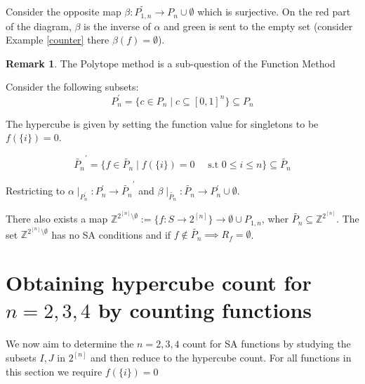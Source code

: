 \documentclass[a4paper,12pt]{article}
\theoremstyle{definition}
\theoremstyle{indented}
\newtheorem*{remark}{Remark}
\begin{document}
   Consider the opposite map $\beta: \tilde{P_{1,n}} \rightarrow P_n \cup \emptyset$ which is surjective. On the red part of the diagram, $\beta$ is the inverse of $\alpha$ and green is sent to the empty set (consider Example \ref{counter} there $\beta(f)=\emptyset$).
 
    \medskip 
    
    
    \begin{remark}
             The Polytope method is a sub-question of the Function Method
    \end{remark}
        Consider the following subsets: 
            $$P_n ^{'} = \{ c \in P_n \mid c \subseteq [0,1]^n\} \subseteq  P_n$$
            
            The hypercube is given by setting the function value for singletons to be $f(\{i\})=0$.

            
            $$\tilde{P_n}^{'} = \{ f \in  \tilde{P_{n}} \mid  f (\{ i \})=0 \quad \text{ s.t }  0 \le i\le n \} \subseteq \tilde{P_n}$$
            
            
    Restricting to $\alpha \mid_{P_n ^{'}} : P_n ^{'} \rightarrow \tilde{P_n}^{'}$ and  $\beta \mid _{\tilde{P_n}} : \tilde{P_n} \rightarrow P_{n}^{'} \cup \emptyset$. 
    
    \medskip
    
     There also exists a map $\mathbb{Z}^{ 2^{[n]} \setminus \emptyset} := \{ f : S \rightarrow  2^{[n]} \} \rightarrow  \emptyset \cup P_{1,n}$, wher $\tilde{P_n}   \subseteq \mathbb{Z}^{ 2^{[n]} }$.  The set $\mathbb{Z}^{ 2^{[n]} \setminus \emptyset}$ has no SA conditions and if $f \notin \tilde{P_n}  \implies R_f=\emptyset$.

\section{Obtaining hypercube count for $n=2,3,4$ by counting functions}

We now aim to determine the $n=2,3,4$ count for SA functions by studying the subsets $I,J$ in $ 2^{[n]}$ and then reduce to the hypercube count. For all functions in this section we require $f(\{i\})=0$
\end{document}
